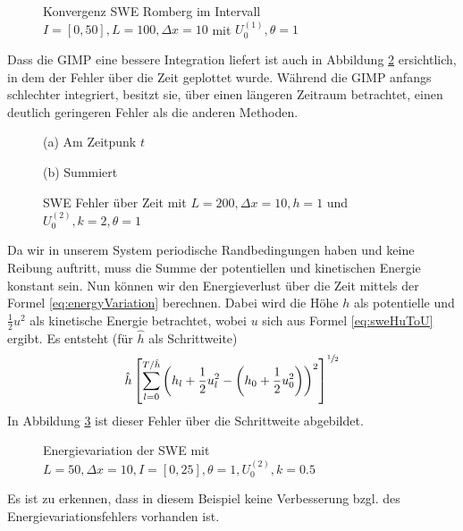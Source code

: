 \begin{figure}
\centering

\caption{Konvergenz SWE Romberg im Intervall $I = [0,50], L=100, \Delta x=10$ mit $U_0^{(1)},\theta=1$}
\label{fig:sweConvergenceRomberg}
\end{figure}
Dass die GIMP eine bessere Integration liefert ist auch in Abbildung \ref{fig:sweErrorOverTime} ersichtlich, in dem der Fehler über die Zeit geplottet wurde. Während die GIMP anfangs schlechter integriert, besitzt sie, über einen längeren Zeitraum betrachtet, einen deutlich geringeren Fehler als die anderen Methoden.

\begin{figure}
\footnotesize
\begin{minipage}[b]{0.49\linewidth}
\centering

\caption*{(a) Am Zeitpunk $t$}
\end{minipage}
\begin{minipage}[b]{0.49\linewidth}
\centering

\caption*{(b) Summiert}
\end{minipage}
\caption{SWE Fehler über Zeit mit $L=200,\Delta x=10,h = 1$ und $U_0^{(2)},k=2,\theta=1$}
\label{fig:sweErrorOverTime}
\end{figure}
Da wir in unserem System periodische Randbedingungen haben und keine Reibung auftritt, muss die Summe der potentiellen und kinetischen Energie konstant sein. Nun können wir den Energieverlust über die Zeit mittels der Formel \eqref{eq:energyVariation} berechnen. Dabei wird die Höhe $h$ als potentielle und $\frac{1}{2}u^2$ als kinetische Energie betrachtet, wobei $u$ sich aus Formel \eqref{eq:sweHuToU} ergibt. Es entsteht (für $\hat h$ als Schrittweite)
\[
 \hat h \left[\sum_{l=0}^{T/\hat h} \left( h_l + \frac{1}{2} u_l^2 - \left(h_0 + \frac{1}{2} u_0^2\right)\right)^2\right]^{\sfrac{1}{2}}
\]
In Abbildung \ref{fig:sweEnergyVariation} ist dieser Fehler über die Schrittweite abgebildet.
\begin{figure}
\centering

\caption{Energievariation der SWE mit $L=50,\Delta x = 10, I = [0,25],\theta=1,U_0^{(2)},k=0.5$}
\label{fig:sweEnergyVariation}
\end{figure}
Es ist zu erkennen, dass in diesem Beispiel keine Verbesserung bzgl. des Energievariationsfehlers vorhanden ist.
